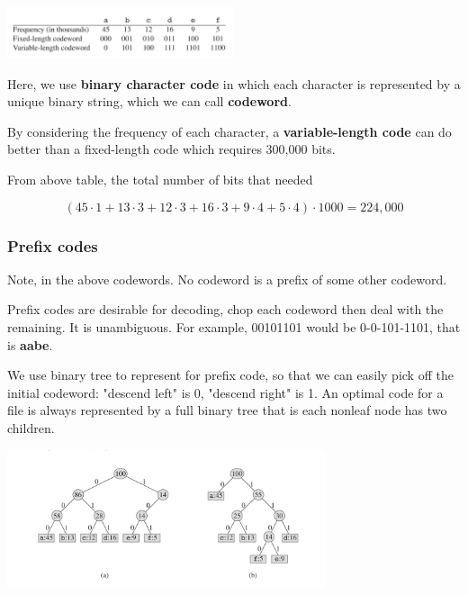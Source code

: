     \includegraphics[width=0.5\textwidth]{contents/Advanced_Design/Greedy/greedy_image/frequency_table.png}

    Here, we use \textbf{binary character code} in which each character
    is represented by a unique binary string, which we can
    call \textbf{codeword}.

    By considering the frequency of each character, a \textbf{variable-length code}
    can do better than a fixed-length code which requires 300,000 bits.

    From above table, the total number of bits that needed

    \begin{equation*}
        (45\cdot 1 + 13\cdot 3 + 12\cdot 3 +16\cdot 3 + 9\cdot 4 + 5\cdot 4) \cdot 1000 =  224,000 
    \end{equation*}

    \subsubsection*{Prefix codes}

    Note, in the above codewords. No codeword is a prefix of some other codeword.

    Prefix codes are desirable for decoding, chop each codeword then deal with 
    the remaining. It is unambiguous. For example, 00101101 would be 
    0-0-101-1101, that is \textbf{aabe}.
    
    We use binary tree to represent for prefix code, so that we can easily pick 
    off the initial codeword: "descend left" is 0, "descend right" is 1. An 
    optimal code for a file is always represented by a full binary tree that is 
    each nonleaf node has two children.

    \includegraphics[width=0.7\textwidth]{contents/Advanced_Design/Greedy/greedy_image/prefix_code_trees.png}

